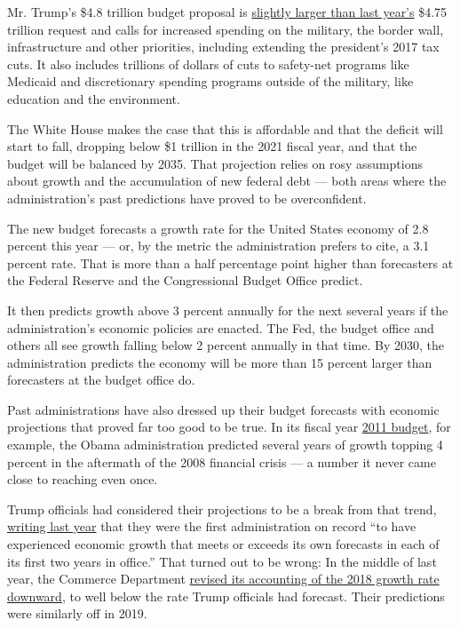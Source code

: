 Mr. Trump's \$4.8 trillion budget proposal is
\href{https://www.nytimes3xbfgragh.onion/2019/03/11/us/politics/trump-budget.html}{slightly
larger than last year's} \$4.75 trillion request and calls for increased
spending on the military, the border wall, infrastructure and other
priorities, including extending the president's 2017 tax cuts. It also
includes trillions of dollars of cuts to safety-net programs like
Medicaid and discretionary spending programs outside of the military,
like education and the environment.

The White House makes the case that this is affordable and that the
deficit will start to fall, dropping below \$1 trillion in the 2021
fiscal year, and that the budget will be balanced by 2035. That
projection relies on rosy assumptions about growth and the accumulation
of new federal debt --- both areas where the administration's past
predictions have proved to be overconfident.

The new budget forecasts a growth rate for the United States economy of
2.8 percent this year --- or, by the metric the administration prefers
to cite, a 3.1 percent rate. That is more than a half percentage point
higher than forecasters at the Federal Reserve and the Congressional
Budget Office predict.

It then predicts growth above 3 percent annually for the next several
years if the administration's economic policies are enacted. The Fed,
the budget office and others all see growth falling below 2 percent
annually in that time. By 2030, the administration predicts the economy
will be more than 15 percent larger than forecasters at the budget
office do.

Past administrations have also dressed up their budget forecasts with
economic projections that proved far too good to be true. In its fiscal
year
\href{https://www.govinfo.gov/content/pkg/BUDGET-2011-BUD/pdf/BUDGET-2011-BUD.pdf}{2011
budget}, for example, the Obama administration predicted several years
of growth topping 4 percent in the aftermath of the 2008 financial
crisis --- a number it never came close to reaching even once.

Trump officials had considered their projections to be a break from that
trend,
\href{https://www.whitehouse.gov/articles/administration-growth-forecasts-historical-perspective/}{writing
last year} that they were the first administration on record ``to have
experienced economic growth that meets or exceeds its own forecasts in
each of its first two years in office.'' That turned out to be wrong: In
the middle of last year, the Commerce Department
\href{https://www.nytimes3xbfgragh.onion/2019/08/21/business/economy/jobs-growth-revision.html}{revised
its accounting of the 2018 growth rate downward}, to well below the rate
Trump officials had forecast. Their predictions were similarly off in
2019.

